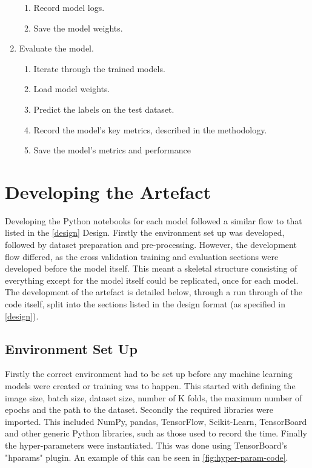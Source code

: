 \begin{enumerate}
\begin{enumerate}
        \item Record model logs.
        \item Save the model weights.
    \end{enumerate}
    \item Evaluate the model.
    \begin{enumerate}
        \item Iterate through the trained models.
        \item Load model weights.
        \item Predict the labels on the test dataset.
        \item Record the model's key metrics, described in the methodology.
        \item Save the model's metrics and performance
    \end{enumerate}
\end{enumerate}

\section{Developing the Artefact}
Developing the Python notebooks for each model followed a similar flow to that listed in the \autoref{design} Design. Firstly the environment set up was developed, followed by dataset preparation and pre-processing. However, the development flow differed, as the cross validation training and evaluation sections were developed before the model itself. This meant a skeletal structure consisting of everything except for the model itself could be replicated, once for each model. The development of the artefact is detailed below, through a run through of the code itself, split into the sections listed in the design format (as specified in \autoref{design}).

\subsection{Environment Set Up}
Firstly the correct environment had to be set up before any machine learning models were created or training was to happen. This started with defining the image size, batch size, dataset size, number of K folds, the maximum number of epochs and the path to the dataset. Secondly the required libraries were imported. This included NumPy, pandas, TensorFlow, Scikit-Learn, TensorBoard and other generic Python libraries, such as those used to record the time. Finally the hyper-parameters were instantiated. This was done using TensorBoard's "hparams" plugin. An example of this can be seen in \autoref{fig:hyper-param-code}.

